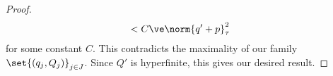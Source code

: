 \documentclass[10pt]{mypackage}
\begin{document}
\begin{proof}
{\begin{align*}
                                                                                                                                                                                                                                                                                                                                                                                                                                                                                                                                                                                                                                                                                                                                                                                                                                                                                                                                                                                                                                                                                                                                                                                                                                                                                                                                                                                                                                                                                                                                                                                                                                                                                                                                                                                                                                                                                                                                                                                                                                                                                                                                                                                                                                                                                                                                                                                                                                                                                                                                                                                                                                                                                                                                          &< C \ve\norm{q' + p}_{\tau}^2
  \end{align*}}
  for some constant $C$. This contradicts the maximality of our family $\set{\left( q_j,Q_j \right)}_{j\in J}$. Since $ Q' $ is hyperfinite, this gives our desired result.
\end{proof}
\nocite{ii1_factors_anantharaman_popa,brown_and_ozawa}
\printbibliography
\end{document}
